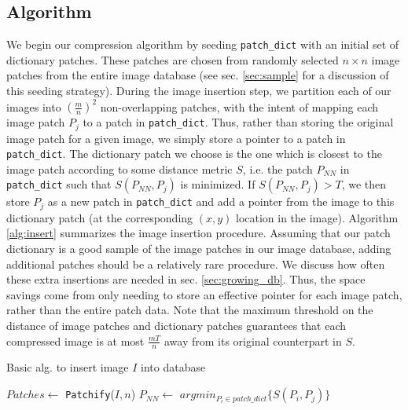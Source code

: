 \subsection{Algorithm} \label{sec:alg}

We begin our compression algorithm by seeding \texttt{patch\_dict} with an initial set of dictionary patches.  These patches are chosen from randomly selected $n \times n$ image patches from the entire image database (see sec. \ref{sec:sample} for a discussion of this seeding strategy).   During the image insertion step, we partition each of our images into $\left(\frac{m}{n}\right)^2$ non-overlapping patches, with the intent of mapping each image patch $P_j$ to a patch in \texttt{patch\_dict}.  Thus, rather than storing the original image patch for a given image, we simply store a pointer to a patch in \texttt{patch\_dict}.  The dictionary patch we choose is the one which is closest to the image patch according to some distance metric $S$, i.e. the patch $P_{NN}$ in \texttt{patch\_dict} such that $S(P_{NN}, P_j)$ is minimized.  If $S(P_{NN}, P_j) > T$, we then store $P_j$ as a new patch in \texttt{patch\_dict} and add a pointer from the image to this dictionary patch  (at the corresponding $(x,y)$ location in the image).  Algorithm \ref{alg:insert} summarizes the image insertion procedure. Assuming that our patch dictionary is a good sample of the image patches in our image database, adding additional patches should be a relatively rare procedure.  We discuss how often these extra insertions are needed in sec. \ref{sec:growing_db}. Thus, the space savings come from only needing to store an effective pointer for each image patch, rather than the entire patch data.  Note that the maximum threshold on the distance of image patches and dictionary patches guarantees that each compressed image is at most $\frac{mT}{n}$ away from its original counterpart in $S$.

\begin{algorithm}
    \caption{Basic alg. to insert image $I$ into database}
    \label{alg:insert}
\begin{algorithmic}[1]
\State $Patches \leftarrow $ \texttt{Patchify}($I,n$)
\State $P_{NN} \leftarrow $ $argmin_{P_i \in patch\_dict} \{ S(P_i, P_j) \}$
\EndIf
\EndFor
\vspace{3mm}
\end{algorithmic}
\end{algorithm}

